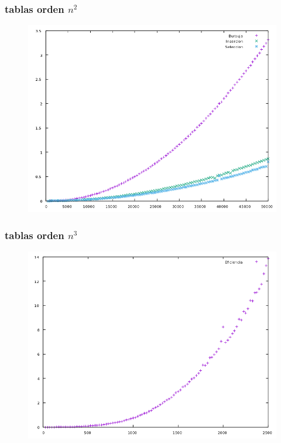 \documentclass[compress]{beamer}
\begin{document}
\begin{frame}
\frametitle{tablas orden $n^2$}
	\begin{figure}
  \centering
    \includegraphics[width=1\textwidth]{Eficiencian2.png}
  \label{fig:ejemplo}
\end{figure}
\end{frame}
\begin{frame}
\frametitle{tablas orden $n^3$}
	\begin{figure}
  \centering
    \includegraphics[width=1\textwidth]{Floyd.png}
  \label{fig:ejemplo}
\end{figure}
\end{frame}
\end{document}
